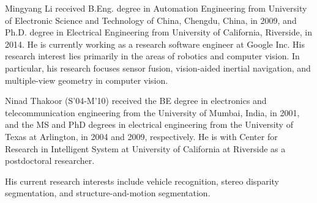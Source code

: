 \documentclass[10pt,journal]{IEEEtran}
\begin{document}
\begin{IEEEbiography}{Mingyang Li} received B.Eng. degree in Automation Engineering from University of Electronic Science and Technology of China, Chengdu, China, in 2009, and Ph.D. degree in
Electrical Engineering from University of California, Riverside, in 2014. He is currently working as a research software engineer at Google Inc. His research interest lies primarily in the areas of robotics and computer vision. In particular, his research focuses sensor fusion, vision-aided inertial navigation, and multiple-view geometry in computer vision. 

\end{IEEEbiography}


\begin{IEEEbiography}{Ninad Thakoor} 
(S'04-M'10) received the BE degree in electronics and telecommunication engineering from the University of Mumbai, India, in 2001, and the MS and PhD degrees in electrical engineering from the University of Texas at Arlington, in 2004 and 2009, respectively. He is with Center for Research in Intelligent System at University of California at Riverside as a postdoctoral researcher.

His current research interests include vehicle recognition, stereo disparity segmentation, and structure-and-motion segmentation.
\end{IEEEbiography}
\end{document}
